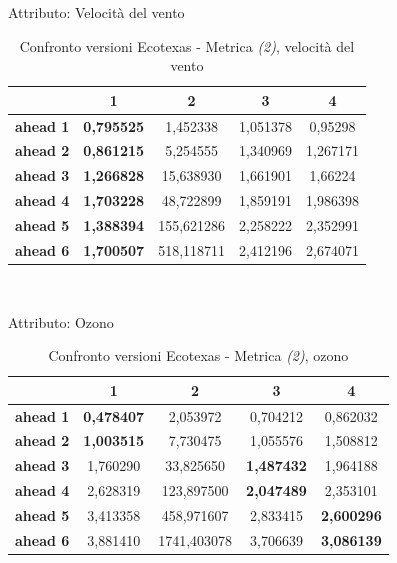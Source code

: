 \documentclass[12pt,a4paper,oneside,openright]{book}
\begin{document}
\medskip

Attributo: Velocità del vento \\ 

\begin{table}[H]
\centering
\begin{tabular}{|c|c|c|c|c|}
\hline
& 1 & 2 & 3 & 4 \\
\hline
\textbf{ahead 1} & \textbf{0,795525} & 1,452338 & 1,051378 & 0,95298\\
\hline
\textbf{ahead 2} & \textbf{0,861215} & 5,254555 & 1,340969 & 1,267171\\ 
\hline
\textbf{ahead 3} & \textbf{1,266828} & 15,638930 & 1,661901 & 1,66224\\
\hline
\textbf{ahead 4} & \textbf{1,703228} & 48,722899 & 1,859191 & 1,986398\\ 
\hline
\textbf{ahead 5} & \textbf{1,388394} & 155,621286 & 2,258222 & 2,352991\\
\hline
\textbf{ahead 6} & \textbf{1,700507} & 518,118711 & 2,412196 & 2,674071\\ 
\hline
\end{tabular} \\
\caption{Confronto versioni Ecotexas - Metrica \textit{(2)}, velocità del vento}
\end{table} 

\medskip

Attributo: Ozono \\ 

\begin{table}[H]
\centering
\begin{tabular}{|c|c|c|c|c|}
\hline
& 1 & 2 & 3 & 4 \\
\hline
\textbf{ahead 1} & \textbf{0,478407} & 2,053972 & 0,704212 & 0,862032\\
\hline
\textbf{ahead 2} & \textbf{1,003515} & 7,730475 & 1,055576 & 1,508812\\ 
\hline
\textbf{ahead 3} & 1,760290 & 33,825650 & \textbf{1,487432} & 1,964188\\
\hline
\textbf{ahead 4} & 2,628319 & 123,897500 & \textbf{2,047489} & 2,353101\\ 
\hline
\textbf{ahead 5} & 3,413358 & 458,971607 & 2,833415 & \textbf{2,600296}\\
\hline
\textbf{ahead 6} & 3,881410 & 1741,403078 & 3,706639 & \textbf{3,086139}\\ 
\hline
\end{tabular} \\
\caption{Confronto versioni Ecotexas - Metrica \textit{(2)}, ozono}
\end{table} 
\end{document}
